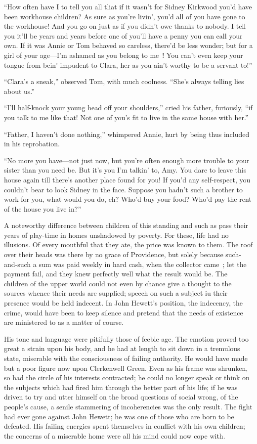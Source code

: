 ``How often have I to tell you all tliat if it wasn't for Sidney
Kirkwood you'd have been workhouse children? As sure as you're livin',
you'd all of you have gone to the workhouse! And you go on just as if
you didn't owe thanks to nobody. I tell you it'll be years and years
before one of you'll have a penny you can call your own. If it was Annie
or Tom behaved so careless, there'd be less wonder; but for a girl of
your age---I'm ashamed as you belong to me~! You can't even keep your
tongue from bein' impudent to Clara, her as you ain't worthy to be a
servant to!''

``Clara's a sneak,'' observed Tom, with much coolness. ``She's always
telling lies about us.''

``I'll half-knock your young head off your shoulders,'' cried his
father, furiously, ``if you talk to me like that! Not one of you's fit
to live in the same house with her.''

``Father, I haven't done nothing,'' whimpered {} Annie, hurt by being
thus included in his reprobation.

``No more you have---not just now, but you're often enough more trouble
to your sister than you need be. But it's you I'm talkin' to, Amy. You
dare to leave this house again till there's another place found for you!
If you'd any self-respect, you couldn't bear to look Sidney in the face.
Suppose you hadn't such a brother to work for you, what would you do,
eh? Who'd buy your food? Who'd pay the rent of the house you live in?''

A noteworthy difference between children of this standing and such as
pass their years of play-time in homes unshadowed by poverty. For these,
life had no illusions. Of every mouthful that they ate, the price was
known to them. The roof over their heads was there by no grace of
Providence, but solely because such-and-such a sum was paid weekly in
hard cash, when the collector came~; let the payment fail, and they knew
perfectly well what the result would be. The children of the upper world
could not even by chance give a thought to the sources whence their
needs are {} supplied; speech on such a subject iu their presence would
be held indecent. In John Hewett's position, the indecency, the crime,
would have been to keep silence and pretend that the needs of existence
are ministered to as a matter of course.

His tone and language were pitifully those of feeble age. The emotion
proved too great a strain upon his body, and he had at length to sit
down in a tremulous state, miserable with the consciousness of failing
authority. He would have made but a poor figure now upon Clerkenwell
Green. Even as his frame was shrunken, so had the circle of his
interests contracted; he could no longer speak or think on the subjects
which had fired him through the better part of his life; if he was
driven to try and utter himself on the broad questions of social wrong,
of the people's cause, a senile stammering of incoherencies was the only
result. The fight had ever gone against John Hewett; he was one of those
who are born to be defeated. His failing energies spent themselves in
conflict with his own children; the concerns of a miserable home were
all his mind could now cope with.

